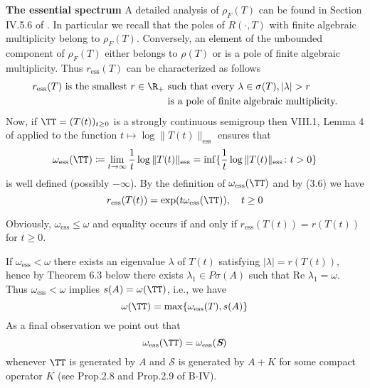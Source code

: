 \begin{example}{\textbf{The essential spectrum}}
A detailed analysis of $\rho_{F}(T)$ can be found in Section IV.5.6 of \citet{kato:1966}.
In particular we recall that the poles of $R(\cdot,T)$ with finite algebraic multiplicity belong to $\rho_{F}(T)$.
Conversely, an element of the unbounded component of $\rho_{F}(T)$ either belongs to $\rho(T)$ or is a pole of finite algebraic multiplicity.
Thus $r_{\text{ess}}(T)$ can be characterized as follows
\begin{equation}\label{eq:a3-3.7}
\begin{split}
r_{\text{ess}}(T) \text{ is the smallest } r \in \R_{+}
& \text{ such that every } \lambda \in \sigma(T), |\lambda| > r \\
& \text{ is a pole of finite algebraic multiplicity.}
\end{split}
\end{equation}
Now, if $\TT = (T(t))_{t \geq 0}$ is a strongly continuous semigroup then VIII.1, Lemma 4 of \citet{dunfordschwartz:1958} applied to the function $t \mapsto \log \|T(t)\|_{\text{ess}}$ ensures that
\begin{equation}\label{eq:a3-3.8}
\omega_{\text{ess}}(\TT) \coloneqq \lim_{t \to \infty} \frac{1}{t} \log\|T(t)\|_{\text{ess}} = \inf \{\frac{1}{t} \log\|T(t)\|_{\text{ess}} \colon t > 0\}
\end{equation}
is well defined (possibly $-\infty$).
By the definition of $\omega_{\text{ess}}(\TT)$ and by (3.6) we have
\begin{equation}\label{eq:a3-3.9}
r_{\text{ess}}(T(t)) = \exp(t\omega_{\text{ess}}(\TT)), \quad t \geq 0
\end{equation}

Obviously, $\omega_{\text{ess}} \leq \omega$ and equality occurs if and only if $r_{\text{ess}}(T(t)) = r(T(t))$ for $t \geq 0$.

If $\omega_{\text{ess}} < \omega$ there exists an eigenvalue $\lambda$ of $T(t)$ satisfying $|\lambda| = r(T(t))$, hence by Theorem 6.3 below there exists $\lambda_{1} \in P\sigma(A)$ such that $\text{Re }\lambda_{1} = \omega$.
Thus $\omega_{\text{ess}} < \omega$ implies $s(A) = \omega(\TT)$, i.e., we have
\begin{equation}\label{eq:a3-3.10}
\omega(\TT) = \max\{\omega_{\text{ess}}(T),s(A)\}
\end{equation}
As a final observation we point out that
\begin{equation}\label{eq:a3-3.11}
\omega_{\text{ess}}(\TT) = \omega_{\text{ess}}({\textit{\textbf S}})
\end{equation}
whenever $\TT$ is generated by $A$ and $\mathcal{S}$ is generated by $A + K$ for some compact operator $K$ (see Prop.2.8 and Prop.2.9 of B-IV).
\end{example}
